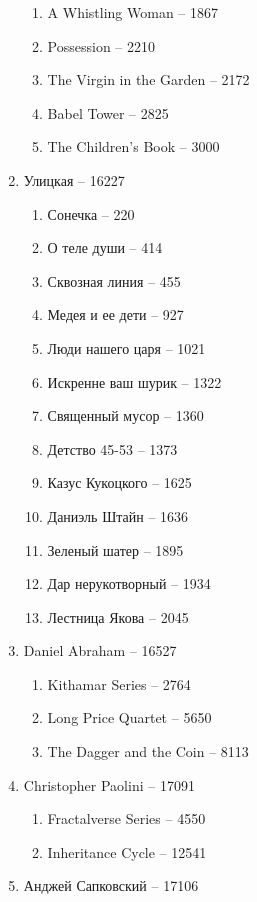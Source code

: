\documentclass[a4paper, 11pt]{proc} %
\begin{document}
\begin{enumerate}
\begin{enumerate}
            \item A Whistling Woman -- 1867
            \item Possession -- 2210
            \item The Virgin in the Garden -- 2172
            \item Babel Tower -- 2825
            \item The Children's Book -- 3000
        \end{enumerate}
    \item Улицкая -- 16227
        \begin{enumerate}
            \item Сонечка -- 220
            \item О теле души -- 414
            \item Сквозная линия -- 455
            \item Медея и ее дети -- 927
            \item Люди нашего царя -- 1021
            \item Искренне ваш шурик -- 1322
            \item Священный мусор -- 1360
            \item Детство 45-53 -- 1373
            \item Казус Кукоцкого -- 1625
            \item Даниэль Штайн -- 1636
            \item Зеленый шатер -- 1895
            \item Дар нерукотворный -- 1934
            \item Лестница Якова -- 2045
        \end{enumerate}
    \item Daniel Abraham -- 16527
        \begin{enumerate}
            \item Kithamar Series -- 2764
            \item Long Price Quartet -- 5650
            \item The Dagger and the Coin -- 8113
        \end{enumerate}
    \item Christopher Paolini -- 17091
        \begin{enumerate}
            \item Fractalverse Series -- 4550
            \item Inheritance Cycle -- 12541
        \end{enumerate}
    \item Анджей Сапковский -- 17106

\end{enumerate}
\end{document}
